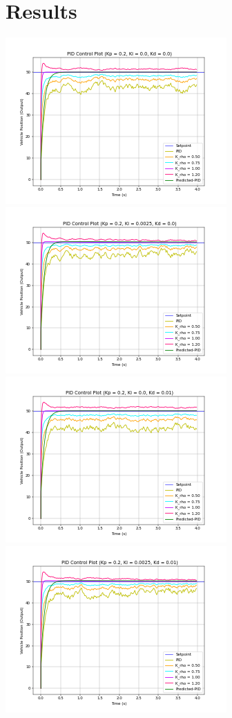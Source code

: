 \documentclass[9pt]{article}
\begin{document}
\section{Results}
\includegraphics[scale=.425]{figures/Figure_1.png}
\includegraphics[scale=.425]{figures/Figure_2.png}\\[0.4mm]
\includegraphics[scale=.425]{figures/Figure_3.png}
\includegraphics[scale=.425]{figures/Figure_4.png}
\end{document}

